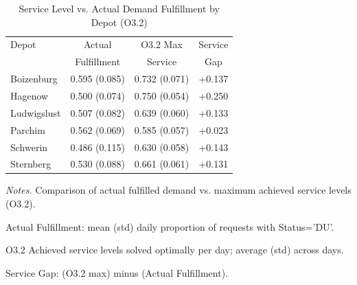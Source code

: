 \begin{table}[ht]
\centering
\caption{Service Level vs. Actual Demand Fulfillment by Depot (O3.2)}
\label{tab:service_vs_fulfillment}
\begin{threeparttable}
\begin{tabular}{lccc}
\toprule
Depot & Actual & O3.2 Max & Service \\
& Fulfillment & Service & Gap \\
\midrule
Boizenburg & 0.595 (0.085) & 0.732 (0.071) & +0.137 \\
Hagenow & 0.500 (0.074) & 0.750 (0.054) & +0.250 \\
Ludwigslust & 0.507 (0.082) & 0.639 (0.060) & +0.133 \\
Parchim & 0.562 (0.069) & 0.585 (0.057) & +0.023 \\
Schwerin & 0.486 (0.115) & 0.630 (0.058) & +0.143 \\
Sternberg & 0.530 (0.088) & 0.661 (0.061) & +0.131 \\
\bottomrule
\end{tabular}
\begin{tablenotes}
\smaller
\item \textit{Notes.} Comparison of actual fulfilled demand vs. maximum achieved service levels (O3.2).
\item Actual Fulfillment: mean (std) daily proportion of requests with Status='DU'.
\item O3.2 Achieved service levels solved optimally per day; average (std) across days.
\item Service Gap: (O3.2 max) minus (Actual Fulfillment).
\end{tablenotes}
\end{threeparttable}
\end{table}
